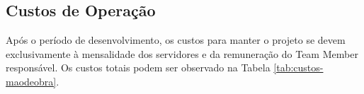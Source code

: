 \documentclass[
    12pt,               %
    openright,          %
    oneside,
    a4paper,            %
    BIBLATEX,           %
    TODO,               %
    english,            %
    brazil              %
    ]{ifsp-spo-inf-ctds}
\begin{document}

        \subsection{Custos de Operação}
        
            Após o período de desenvolvimento, os custos para manter o projeto se devem exclusivamente à mensalidade dos servidores e da remuneração do Team Member responsável. Os custos totais podem ser observado na Tabela \ref{tab:custos-maodeobra}.
\end{document}
